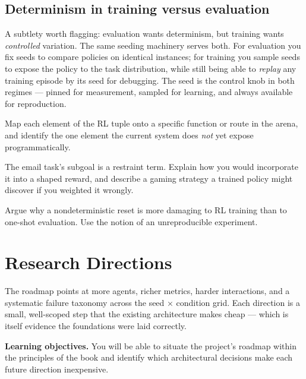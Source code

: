 \documentclass[11pt,openany]{book}
\newcommand{\code}[1]{\textcolor{clayd}{\texttt{\detokenize{#1}}}}
\newcommand{\exhead}{\vspace{0.8em}\needspace{3\baselineskip}%
  \noindent{\large\bfseries\color{clayd}Exercises}\par\nobreak\vspace{0.3em}}
\begin{document}
\section{Determinism in training versus evaluation}

A subtlety worth flagging: evaluation wants determinism, but training wants
\emph{controlled} variation. The same seeding machinery serves both. For
evaluation you fix seeds to compare policies on identical instances; for training
you sample seeds to expose the policy to the task distribution, while still being
able to \emph{replay} any training episode by its seed for debugging. The seed is
the control knob in both regimes — pinned for measurement, sampled for learning,
and always available for reproduction.

\exhead
\begin{exercises}
\item Map each element of the RL tuple onto a specific function or route in the
arena, and identify the one element the current system does \emph{not} yet expose
programmatically.
\item The email task's \code{no_extra_archived} subgoal is a restraint term.
Explain how you would incorporate it into a shaped reward, and describe a gaming
strategy a trained policy might discover if you weighted it wrongly.
\item Argue why a nondeterministic reset is more damaging to RL training than to
one-shot evaluation. Use the notion of an unreproducible experiment.
\end{exercises}

\chapter{Research Directions}
\label{ch:research}

\begin{keybox}[.\ ]
The roadmap points at more agents, richer metrics, harder interactions, and a
systematic failure taxonomy across the seed × condition grid. Each direction is a
small, well-scoped step that the existing architecture makes cheap — which is
itself evidence the foundations were laid correctly.
\end{keybox}

\textbf{Learning objectives.} You will be able to situate the project's roadmap
within the principles of the book and identify which architectural decisions make
each future direction inexpensive.
\end{document}
